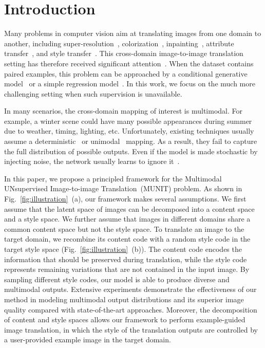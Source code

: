 \documentclass[runningheads]{llncs}
\begin{document}
	\section{Introduction}
	Many problems in computer vision aim at translating images from one domain to another, including
	super-resolution~\cite{dong2014learning}, colorization~\cite{zhang2016colorful}, inpainting~\cite{pathak2016context}, attribute transfer~\cite{laffont2014transient}, and style transfer~\cite{gatys2016image}. This cross-domain image-to-image translation setting has therefore received significant attention~\cite{isola2017image,yi2017dualgan,zhu2017unpaired,kim2017learning,taigman2017unsupervised,zhu2017toward,liu2016coupled,chen2017photographic,liang2017generative,liu2017unsupervised,benaim2017one,royer2017xgan,gan2017triangle,choi2017stargan,wang2018high,shrivastava2017learning,bousmalis2017unsupervised,wolf2017unsupervised,tau2018role,hoshen2018identifying}. When the dataset contains paired examples, this problem can be approached by a conditional generative model~\cite{isola2017image} or a simple regression model~\cite{chen2017photographic}.  In this work, we focus on the much more challenging setting when such supervision is unavailable.


	In many scenarios, the cross-domain mapping of interest is multimodal. For example, a winter scene could have many possible appearances during summer due to weather, timing, lighting, etc. Unfortunately, existing techniques usually assume a deterministic~\cite{zhu2017unpaired,kim2017learning,taigman2017unsupervised} or unimodal~\cite{liu2017unsupervised} mapping. As a result, they fail to capture the full distribution of possible outputs. Even if the model is made stochastic by injecting noise, the network usually learns to ignore it~\cite{isola2017image,mathieu2016deep}.

	In this paper, we propose a principled framework for the Multimodal UNsupervised Image-to-image Translation~(MUNIT) problem. As shown in Fig.~\ref{fig:illustration}~(a), our framework makes several assumptions. We first assume that the latent space of images can be decomposed into a content space and a style space. We further assume that images in different domains share a common content space but not the style space.	To translate an image to the target domain, we recombine its content code with a random style code in the target style space (Fig.~\ref{fig:illustration}~(b)). The content code encodes the information that should be preserved during translation, while the style code represents remaining variations that are not contained in the input image. By sampling different style codes, our model is able to produce diverse and multimodal outputs. Extensive experiments demonstrate the effectiveness of our method in modeling multimodal output distributions and its superior image quality compared with state-of-the-art approaches. Moreover, the decomposition of content and style spaces allows our framework to perform example-guided image translation, in which the style of the translation outputs are controlled by a user-provided example image in the target domain. 
	
\end{document}
